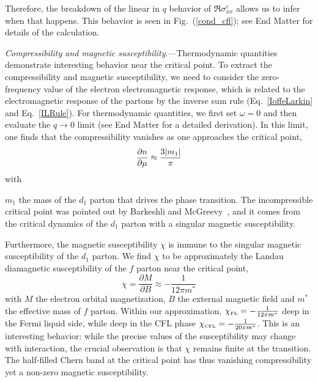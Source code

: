 \documentclass[aps,prl,twocolumn,superscriptaddress,floatfix, 10pt,longbibliography, nofootinbib]{revtex4-2}
\begin{document}
Therefore, the breakdown of the linear in $q$ behavior of $\Re \sigma^e_{xx}$ allows us to infer when that happens. This behavior is seen in Fig.~(\ref{cond_cfl}); see End Matter for details of the calculation.







{\it Compressibility and magnetic susceptibility}.---Thermodynamic quantities demonstrate interesting behavior near the critical point. To extract the compressibility and magnetic susceptibility, we need to consider the zero-frequency value of the electron electromagnetic response, which is related to the electromagnetic response of the partons by the inverse sum rule (Eq.~\eqref{IoffeLarkin} and Eq.~\eqref{ILRule}).
For thermodynamic quantities, we first set $\omega=0$ and then evaluate the $ q\rightarrow 0$ limit (see End Matter for a detailed derivation). In this limit, one finds that the compressibility vanishes as one approaches the critical point,
\begin{equation}
    \frac{\partial n}{\partial \mu}\approx\frac{3\abs{m_1}}{\pi}
\end{equation} with

$m_1$ the mass  of the $d_1$ parton that drives the phase transition. The incompressible critical point was pointed out by Barkeshli and McGreevy~\cite{barkeshli_continuous_2012}, and it comes from the critical dynamics of the $d_1$ parton with a singular magnetic susceptibility.

Furthermore, the magnetic susceptibility $\chi$ is immune to the singular magnetic susceptibility of the $d_1$ parton. We find $\chi$ to be approximately the Landau diamagnetic susceptibility of the $f$ parton near the critical point,
\begin{equation}
    \chi=\frac{\partial M}{\partial B}\approx-\frac{1}{12\pi m^*}
\end{equation} with $M$ the electron orbital magnetization, $B$ the external magnetic field and $m^*$ the effective mass of $f$ parton. Within our approximation, $\chi_\text{\tiny FL}=-\frac{1}{12\pi m^*}$ deep in the Fermi liquid side, while deep in the CFL phase $\chi_\text{\tiny CFL}=-\frac{1}{20\pi m^*}$.  This is an interesting behavior: while the precise values of the susceptibility may change with interaction, the crucial observation is that $\chi$ remains finite at the transition. The half-filled Chern band at the critical point has thus vanishing compressibility yet a non-zero magnetic susceptibility.
\end{document}
